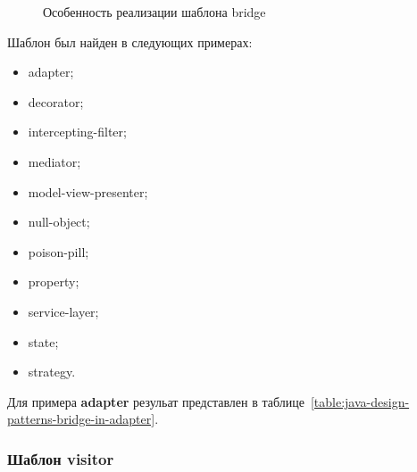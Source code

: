 \begin{figure}[!ht]
\centering
\caption{Особенность реализации шаблона bridge}
\label{fig:java-design-patterns-bridge}
\end{figure}

Шаблон был найден в следующих примерах:
\begin{itemize}
\item adapter;
\item decorator;
\item intercepting-filter;
\item mediator;
\item model-view-presenter;
\item null-object;
\item poison-pill;
\item property;
\item service-layer;
\item state;
\item strategy.
\end{itemize}

Для примера \textbf{adapter} резульат представлен в
таблице~\ref{table:java-design-patterns-bridge-in-adapter}.

\subsubsection{Шаблон visitor}
